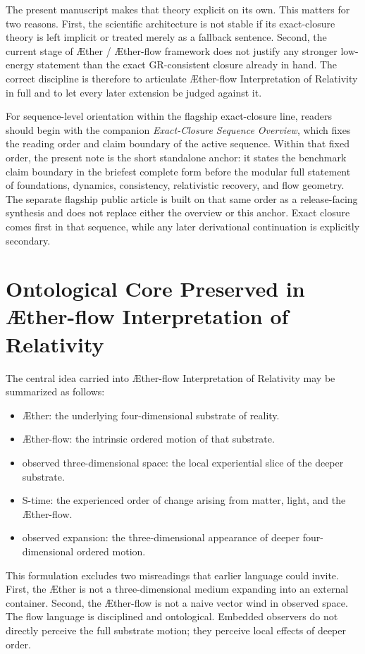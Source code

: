 \documentclass[11pt]{article}
\newcommand{\Aether}{\AE{}ther}
\newcommand{\Aflow}{\AE{}ther-flow}
\newcommand{\TheoryName}{\Aflow{} Interpretation of Relativity}
\newcommand{\TheoryProgram}{\Aether{} / \Aflow{} framework}
\begin{document}
The present manuscript makes that theory explicit on its own. This matters for two reasons. First, the scientific architecture is not stable if its exact-closure theory is left implicit or treated merely as a fallback sentence. Second, the current stage of \TheoryProgram{} does not justify any stronger low-energy statement than the exact GR-consistent closure already in hand. The correct discipline is therefore to articulate \TheoryName{} in full and to let every later extension be judged against it.

For sequence-level orientation within the flagship exact-closure line, readers should begin with the companion \emph{Exact-Closure Sequence Overview}, which fixes the reading order and claim boundary of the active sequence. Within that fixed order, the present note is the short standalone anchor: it states the benchmark claim boundary in the briefest complete form before the modular full statement of foundations, dynamics, consistency, relativistic recovery, and flow geometry. The separate flagship public article is built on that same order as a release-facing synthesis and does not replace either the overview or this anchor. Exact closure comes first in that sequence, while any later derivational continuation is explicitly secondary.

\section{Ontological Core Preserved in \TheoryName{}}

The central idea carried into \TheoryName{} may be summarized as follows:
\begin{itemize}
    \item \Aether{}: the underlying four-dimensional substrate of reality.
    \item \Aflow{}: the intrinsic ordered motion of that substrate.
    \item observed three-dimensional space: the local experiential slice of the deeper substrate.
    \item S-time: the experienced order of change arising from matter, light, and the \Aflow{}.
    \item observed expansion: the three-dimensional appearance of deeper four-dimensional ordered motion.
\end{itemize}

This formulation excludes two misreadings that earlier language could invite. First, the \Aether{} is not a three-dimensional medium expanding into an external container. Second, the \Aflow{} is not a naive vector wind in observed space. The flow language is disciplined and ontological. Embedded observers do not directly perceive the full substrate motion; they perceive local effects of deeper order.
\end{document}
